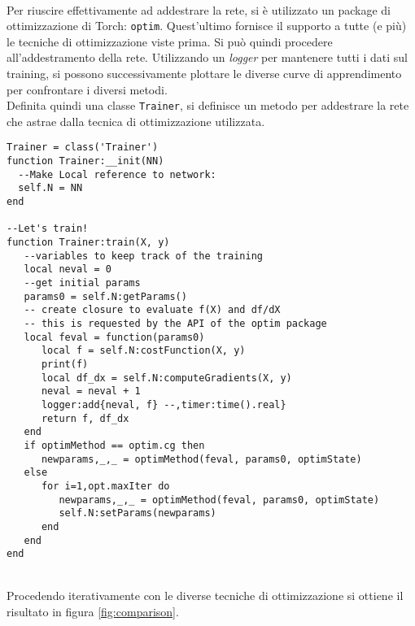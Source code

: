 \\
Per riuscire effettivamente ad addestrare la rete, si è utilizzato un package di ottimizzazione di Torch: \texttt{optim}. Quest'ultimo fornisce il supporto a tutte (e più) le tecniche di ottimizzazione viste prima. 
Si può quindi procedere all'addestramento della rete. Utilizzando un \emph{logger} per mantenere tutti i dati sul training, si possono successivamente plottare le diverse curve di apprendimento per confrontare i diversi metodi. \\
Definita quindi una classe \texttt{Trainer}, si definisce un metodo per addestrare la rete che astrae dalla tecnica di ottimizzazione utilizzata. 
\begin{lstlisting}[language={[5.2]Lua}]
Trainer = class('Trainer')
function Trainer:__init(NN)
  --Make Local reference to network:
  self.N = NN
end

--Let's train!
function Trainer:train(X, y)
   --variables to keep track of the training
   local neval = 0
   --get initial params
   params0 = self.N:getParams()
   -- create closure to evaluate f(X) and df/dX
   -- this is requested by the API of the optim package
   local feval = function(params0)
      local f = self.N:costFunction(X, y)
      print(f)
      local df_dx = self.N:computeGradients(X, y)
      neval = neval + 1
      logger:add{neval, f} --,timer:time().real}
      return f, df_dx
   end
   if optimMethod == optim.cg then
      newparams,_,_ = optimMethod(feval, params0, optimState)
   else
      for i=1,opt.maxIter do
         newparams,_,_ = optimMethod(feval, params0, optimState)
         self.N:setParams(newparams)
      end
   end
end
\end{lstlisting}
\\
Procedendo iterativamente con le diverse tecniche di ottimizzazione si ottiene il risultato in figura \ref{fig:comparison}. 


